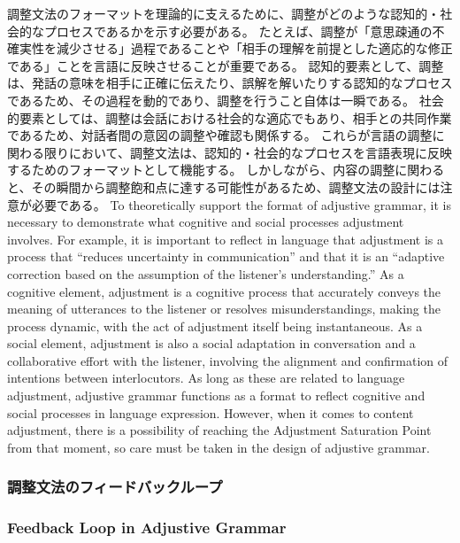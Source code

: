 \documentclass[a4paper]{article}
\begin{document}
\ifJPN
調整文法のフォーマットを理論的に支えるために、調整がどのような認知的・社会的なプロセスであるかを示す必要がある。
たとえば、調整が「意思疎通の不確実性を減少させる」過程であることや「相手の理解を前提とした適応的な修正である」ことを言語に反映させることが重要である。
認知的要素として、調整は、発話の意味を相手に正確に伝えたり、誤解を解いたりする認知的なプロセスであるため、その過程を動的であり、調整を行うこと自体は一瞬である。
社会的要素としては、調整は会話における社会的な適応でもあり、相手との共同作業であるため、対話者間の意図の調整や確認も関係する。
これらが言語の調整に関わる限りにおいて、調整文法は、認知的・社会的なプロセスを言語表現に反映するためのフォーマットとして機能する。
しかしながら、内容の調整に関わると、その瞬間から調整飽和点に達する可能性があるため、調整文法の設計には注意が必要である。
\else
To theoretically support the format of adjustive grammar, it is necessary to demonstrate what cognitive and social processes adjustment involves.
For example, it is important to reflect in language that adjustment is a process that ``reduces uncertainty in communication'' and that it is an ``adaptive correction based on the assumption of the listener's understanding.''
As a cognitive element, adjustment is a cognitive process that accurately conveys the meaning of utterances to the listener or resolves misunderstandings, making the process dynamic, with the act of adjustment itself being instantaneous.
As a social element, adjustment is also a social adaptation in conversation and a collaborative effort with the listener, involving the alignment and confirmation of intentions between interlocutors.
As long as these are related to language adjustment, adjustive grammar functions as a format to reflect cognitive and social processes in language expression.
However, when it comes to content adjustment, there is a possibility of reaching the Adjustment Saturation Point from that moment, so care must be taken in the design of adjustive grammar.
\fi

\ifJPN
\subsubsection{調整文法のフィードバックループ}
\else
  \subsubsection{Feedback Loop in Adjustive Grammar}
\fi
\end{document}
